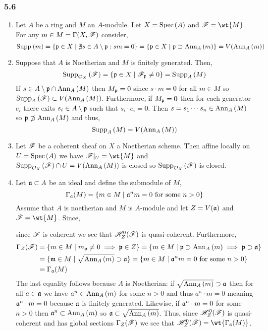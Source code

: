 \documentclass[12pt]{article}
\begin{document}
\subsubsection{5.6}

\begin{enumerate}
\item Let $A$ be a ring and $M$ an $A$-module. Let $X = \mathrm{Spec}\left( A \right)$ and $\F = \wt{M}$. For any $m \in M = \Gamma(X, \mathscr{F})$ consider,
\[ \mathrm{Supp}_{}\left(m \right) = \{ \mathfrak{p} \in X \mid \nexists s \in A \setminus \mathfrak{p} : s m = 0 \} = \{ \mathfrak{p} \in X \mid \mathfrak{p} \supset \mathrm{Ann}_{A}\left(m\right) \} = V(\mathrm{Ann}_{A}\left(m\right)) \]
\item Suppose that $A$ is Noetherian and $M$ is finitely generated. Then,
\[ \mathrm{Supp}_{\mathcal{O}_{X}}\left(\mathscr{F} \right) = \{ \mathfrak{p} \in X \mid \mathscr{F}_{\mathfrak{p}} \neq 0 \} = \mathrm{Supp}_{A}\left(M \right) \]
If $s \in A \setminus \mathfrak{p} \cap \mathrm{Ann}_{A}\left(M\right)$ then $M_{\mathfrak{p}} = 0$ since $s \cdot m = 0$ for all $m \in M$ so $\mathrm{Supp}_{A}\left(\mathscr{F} \right) \subset V(\mathrm{Ann}_{A}\left(M\right))$. Furthermore, if $M_{\mathfrak{p}} = 0$ then for each generator $e_i$ there exits $s_i \in A \setminus \mathfrak{p}$ such that $s_i \cdot e_i = 0$. Then $s = s_1 \cdots s_n \in \mathrm{Ann}_{A}\left(M\right)$ so $\mathfrak{p} \not\supset \mathrm{Ann}_{A}\left(M\right)$ and thus,
\[ \mathrm{Supp}_{A}\left(M \right) = V(\mathrm{Ann}_{A}\left(M\right)) \]
\item Let $\mathscr{F}$ be a coherent sheaf on $X$ a Noetherian scheme. Then affine locally on $U = \mathrm{Spec}\left( A \right)$ we have $\F|_U = \wt{M}$ and $\mathrm{Supp}_{\mathcal{O}_{X}}\left(\mathscr{F} \right) \cap U = V(\mathrm{Ann}_{A}\left(M\right))$ is closed so $\mathrm{Supp}_{\mathcal{O}_{X}}\left(\mathscr{F} \right)$ is closed.
\item Let $\mathfrak{a} \subset A$ be an ideal and define the submodule of $M$,
\[ \Gamma_{\mathfrak{a}}(M) = \{ m \in M \mid \mathfrak{a}^n m = 0 \text{ for some } n > 0 \} \]
Assume that $A$ is noetherian and $M$ is $A$-module and let $Z = V(\mathfrak{a})$ and $\F = \wt{M}$. Since,
\begin{center}
\end{center}
since $\mathscr{F}$ is coherent we see that $\mathscr{H}^0_Z(\mathscr{F})$ is quasi-coherent. Furthermore, 
\begin{align*}
\Gamma_Z(\mathscr{F}) & = \{ m \in M \mid m_{\mathfrak{p}} \neq 0 \implies \mathfrak{p} \in Z \} = \{ m \in M \mid \mathfrak{p} \supset \mathrm{Ann}_{A}\left(m\right) \implies \mathfrak{p} \supset \mathfrak{a} \} 
\\
& = \{ \mathfrak{m} \in M \mid \sqrt{\mathrm{Ann}_{A}\left(m\right)} \supset \mathfrak{a} \} = \{ m \in M \mid \mathfrak{a}^n m = 0 \text{ for some } n > 0 \} 
\\
& = \Gamma_{\mathfrak{a}}(M)
\end{align*}
The last equality follows because $A$ is Noetherian: if $\sqrt{\mathrm{Ann}_{A}\left(m\right)} \supset \mathfrak{a}$ then for all $a \in \mathfrak{a}$ we have $a^n \in \mathrm{Ann}_{A}\left(m\right)$ for some $n > 0$ and thus $a^n \cdot m = 0$ meaning $\mathfrak{a}^n \cdot m = 0$ because $\mathfrak{a}$ is finitely generated. Likewise, if $\mathfrak{a}^n \cdot m = 0$ for some $n > 0$ then $\mathfrak{a}^n \subset \mathrm{Ann}_{A}\left(m\right)$ so $\mathfrak{a} \subset \sqrt{\mathrm{Ann}_{A}\left(m\right)}$. Thus, since $\mathscr{H}^0_Z(\mathscr{F})$ is quasi-coherent and has global sections $\Gamma_Z(\mathscr{F})$ we see that $\H^0_Z(\F) = \wt{\Gamma_{\a}(M)}$.


\end{enumerate}
\end{document}
